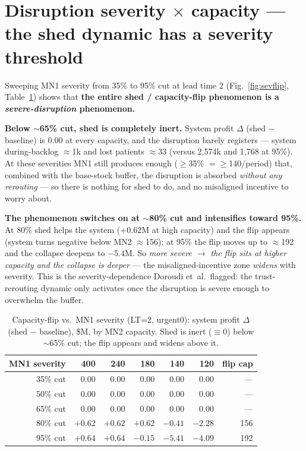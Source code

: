 \documentclass[11pt]{article}
\begin{document}
\section{Disruption severity $\times$ capacity --- the shed dynamic has a severity threshold}

Sweeping MN1 severity from 35\% to 95\% cut at lead time 2 (Fig.~\ref{fig:sevflip},
Table~\ref{tab:sevflip}) shows that \textbf{the entire shed / capacity-flip phenomenon is a
\emph{severe-disruption} phenomenon.}

\textbf{Below $\sim$65\% cut, shed is completely inert.} System profit $\Delta$ (shed $-$
baseline) is $0.00$ at every capacity, and the disruption barely registers --- system
during-backlog $\approx$1k and lost patients $\approx$33 (versus 2{,}574k and 1{,}768 at 95\%).
At these severities MN1 still produces enough ($\ge$35\% $=\ge$140/period) that, combined with the
base-stock buffer, the disruption is absorbed \emph{without any rerouting} --- so there is nothing
for shed to do, and no misaligned incentive to worry about.

\textbf{The phenomenon switches on at $\sim$80\% cut and intensifies toward 95\%.} At 80\% shed
helps the system ($+0.62$M at high capacity) and the flip appears (system turns negative below
MN2 $\approx$156); at 95\% the flip moves up to $\approx$192 and the collapse deepens to $-5.4$M.
So \emph{more severe $\to$ the flip sits at higher capacity and the collapse is deeper} --- the
misaligned-incentive zone \emph{widens} with severity. This is the severity-dependence Doroudi
et~al.\ flagged: the trust-rerouting dynamic only activates once the disruption is severe enough
to overwhelm the buffer.

\begin{table}[h]
\centering\small
\caption{Capacity-flip vs.\ MN1 severity (LT=2, urgent0): system profit $\Delta$ (shed $-$
baseline), \$M, by MN2 capacity. Shed is inert ($\equiv 0$) below $\sim$65\% cut; the flip
appears and widens above it.}
\label{tab:sevflip}
\begin{tabular}{r r r r r r r}
\toprule
MN1 severity & 400 & 240 & 180 & 140 & 120 & flip cap \\
\midrule
35\% cut & $0.00$ & $0.00$ & $0.00$ & $0.00$ & $0.00$ & --- \\
50\% cut & $0.00$ & $0.00$ & $0.00$ & $0.00$ & $0.00$ & --- \\
65\% cut & $0.00$ & $0.00$ & $0.00$ & $0.00$ & $0.00$ & --- \\
80\% cut & $+0.62$ & $+0.62$ & $+0.62$ & $\mathbf{-0.41}$ & $\mathbf{-2.28}$ & 156 \\
95\% cut & $+0.64$ & $+0.64$ & $\mathbf{-0.15}$ & $\mathbf{-5.41}$ & $\mathbf{-4.09}$ & 192 \\
\bottomrule
\end{tabular}
\end{table}
\end{document}
